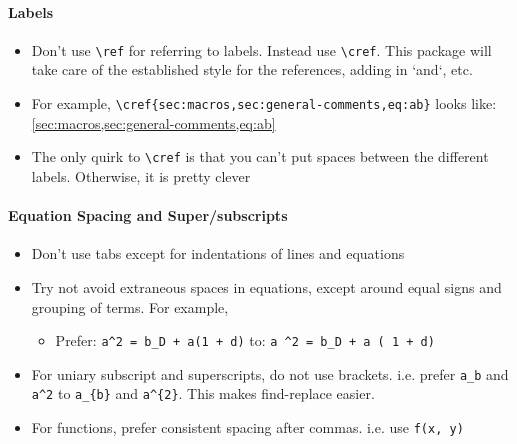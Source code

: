 \documentclass[12pt,etk-draft]{etk-article}
\begin{document}
\paragraph{Labels}
\begin{itemize}
\item Don't use \verb!\ref! for referring to labels.  Instead use \verb!\cref!.  This package will take care of the established style for the references, adding in `and`, etc. 
\item For example, \verb!\cref{sec:macros,sec:general-comments,eq:ab}! looks like: \cref{sec:macros,sec:general-comments,eq:ab}
\item The only quirk to \verb!\cref! is that you can't put spaces between the different labels.  Otherwise, it is pretty clever
\end{itemize}
\paragraph{Equation Spacing and Super/subscripts}
\begin{itemize}
\item Don't use tabs except for indentations of lines and equations
\item Try not avoid extraneous spaces in equations, except around equal signs and grouping of terms.  For example,
\begin{itemize}
\item Prefer: \verb!a^2 = b_D + a(1 + d)! to: \verb!a ^2 = b_D + a ( 1 + d)!
\end{itemize}
\item For uniary subscript and superscripts, do not use brackets.  i.e. prefer \verb!a_b! and \verb!a^2! to \verb!a_{b}! and \verb!a^{2}!.  This makes find-replace easier.
\item For functions, prefer consistent spacing after commas. i.e. use \verb!f(x, y)!
\end{itemize}
\end{document}
